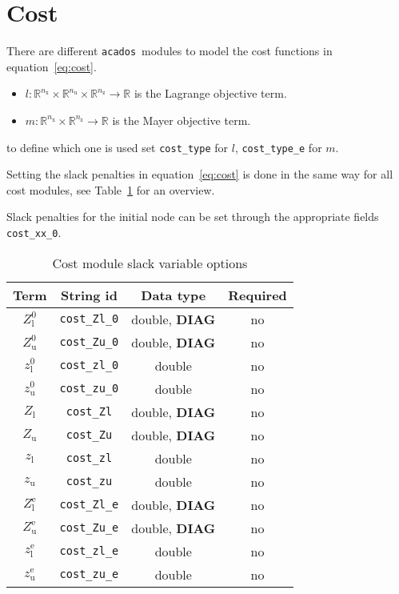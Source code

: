 \documentclass[english]{article}
\newcommand{\code}[1]{\texttt{#1}}
\newcommand{\acados}{\texttt{acados}}
\newcommand{\ind}[1]{_{\textrm{#1}}}
\newcommand{\terminal}{^{\textrm{e}}}
\newcommand{\initial}{^{\textrm{0}}}
\newcommand{\Lower}{\ind{l}}
\newcommand{\upper}{\ind{u}}
\newcommand{\nx}{n\ind{x}}
\newcommand{\nuu}{n\ind{u}}
\newcommand{\nz}{n\ind{z}}
\newcommand{\optional}{no}
\begin{document}
\section{Cost}\label{sec:cost}
%
There are different \acados~modules to model the cost functions in equation~\eqref{eq:cost}.
\begin{itemize}
\item $ l: \mathbb{R}^{\nx}\times\mathbb{R}^{\nuu}\times\mathbb{R}^{\nz} \rightarrow \mathbb{R}$ is the Lagrange objective term.
\item $ m: \mathbb{R}^{\nx}\times\mathbb{R}^{\nz} \rightarrow \mathbb{R} $ is the Mayer objective term.
\end{itemize}
to define which one is used set \code{cost\_type} for $l$, \code{cost\_type\_e} for $m$.

Setting the slack penalties in equation~\eqref{eq:cost} is done in the same way for all cost modules, see Table~\ref{tab:cost:slack} for an overview.

Slack penalties for the initial node can be set through the appropriate fields \code{cost\_xx\_0}.
%
\begin{table}[ht!]
    \centering
    \caption{Cost module slack variable options} \label{tab:cost:slack}
    \begin{tabular}{cccc}
        \toprule
        Term  & String id & Data type & Required \\ \midrule
        $ Z\Lower\initial $ & \code{cost\_Zl\_0} & double, \textbf{DIAG} & \optional   \\
        $ Z\upper\initial $ & \code{cost\_Zu\_0} & double, \textbf{DIAG} & \optional   \\
        $ z\Lower\initial $ & \code{cost\_zl\_0} & double  & \optional   \\
        $ z\upper\initial $ & \code{cost\_zu\_0} & double  & \optional   \\ [1em]
        $ Z\Lower $          & \code{cost\_Zl}    & double, \textbf{DIAG}  & \optional \\
        $ Z\upper $          & \code{cost\_Zu}    & double, \textbf{DIAG}  & \optional   \\
        $ z\Lower $          & \code{cost\_zl}    & double  & \optional   \\
        $ z\upper $          & \code{cost\_zu}    & double  & \optional   \\ [1em]
        $ Z\Lower\terminal $ & \code{cost\_Zl\_e} & double, \textbf{DIAG} & \optional   \\
        $ Z\upper\terminal $ & \code{cost\_Zu\_e} & double, \textbf{DIAG} & \optional   \\
        $ z\Lower\terminal $ & \code{cost\_zl\_e} & double  & \optional   \\
        $ z\upper\terminal $ & \code{cost\_zu\_e} & double  & \optional   \\
        \bottomrule
    \end{tabular}
\end{table}
\end{document}
